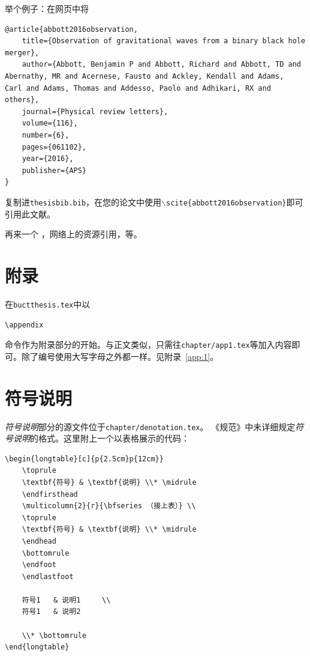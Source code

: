     举个例子：在网页中将
    \begin{lstlisting}
@article{abbott2016observation,
    title={Observation of gravitational waves from a binary black hole    merger},
    author={Abbott, Benjamin P and Abbott, Richard and Abbott, TD and     Abernathy, MR and Acernese, Fausto and Ackley, Kendall and Adams,   Carl and Adams, Thomas and Addesso, Paolo and Adhikari, RX and    others},
    journal={Physical review letters},
    volume={116},
    number={6},
    pages={061102},
    year={2016},
    publisher={APS}
}
    \end{lstlisting}
    复制进\texttt{thesisbib.bib}，在您的论文中使用\texttt{$\backslash$scite\{abbott2016observation\}}即可引用此文献。


    再来一个 ，网络上的资源引用，等。

	
\section{附录}\label{sec:app}
在\texttt{buctthesis.tex}中以
\begin{lstlisting}[firstnumber=68]
\appendix
\end{lstlisting}
命令作为附录部分的开始。与正文类似，只需往\texttt{chapter/app1.tex}等加入内容即可。除了编号使用大写字母之外都一样。见附录~\ref{app:1}。

\section{符号说明}\label{sec:deno}
	\emph{符号说明}部分的源文件位于\texttt{chapter/denotation.tex}。
    《规范》中未详细规定\emph{符号说明}的格式。这里附上一个以表格展示的代码：
    \begin{lstlisting}[caption=以表格展示的最小示例]
\begin{longtable}[c]{p{2.5cm}p{12cm}}
    \toprule
    \textbf{符号} & \textbf{说明} \\* \midrule
    \endfirsthead
    \multicolumn{2}{r}{\bfseries （接上表）} \\
    \toprule
    \textbf{符号} & \textbf{说明} \\* \midrule
    \endhead
    \bottomrule
    \endfoot
    \endlastfoot

    符号1   & 说明1     \\
    符号1   & 说明2     

    \\* \bottomrule
\end{longtable}        
    \end{lstlisting}

